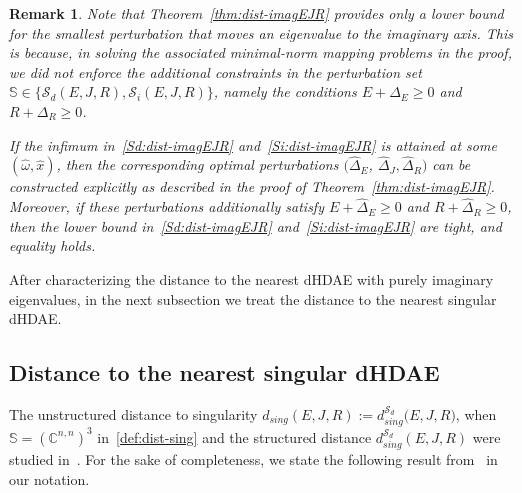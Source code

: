 \documentclass[11pt]{article}
\newtheorem{remark}[theorem]{Remark}
\newcommand{\C}{\mathbb C}
\begin{document}
\begin{remark}{\rm
    Note that Theorem~\ref{thm:dist-imagEJR} provides only a lower bound for the smallest perturbation that moves an eigenvalue to the imaginary axis. This is because, in solving the associated minimal-norm mapping problems in the proof, we did not enforce the additional constraints in the perturbation set $\mathbb S \in \{\mathcal S_d(E,J,R),\mathcal S_i(E,J,R)\}$, namely the conditions $E+\Delta_E \ge 0$ and $R+\Delta_R \ge 0$.

    If the infimum in~\eqref{Sd:dist-imagEJR} and~\eqref{Si:dist-imagEJR} is attained at some $(\hat \omega,\hat x)$, then the corresponding optimal perturbations $(\hat \Delta_E$, $\hat \Delta_J, \hat \Delta_R)$ can be constructed explicitly as described in the proof of Theorem~\ref{thm:dist-imagEJR}. Moreover, if these perturbations additionally satisfy $E+\hat \Delta_E \ge 0$ and $R+\hat \Delta_R \ge 0$, then the lower bound in~\eqref{Sd:dist-imagEJR} and~\eqref{Si:dist-imagEJR} are tight, and equality holds.
    }
\end{remark}
%
After characterizing the distance to the nearest dHDAE with purely imaginary eigenvalues, in the next subsection we treat the distance to the nearest singular dHDAE.
\subsection{Distance to the nearest singular dHDAE}\label{sec:distsing}

The unstructured distance to singularity $d_{sing}(E,J,R):=d_{sing}^{\mathcal S_d}{\mathbb(E,J,R)}$, when $\mathbb S={(\C^{n,n})}^3$ in~\eqref{def:dist-sing} and the structured distance $d_{sing}^{\mathcal S_d}(E,J,R)$ were studied in~\cite{PraS22}. For the sake of completeness, we state the following result from~\cite{PraS22} in our notation.
\end{document}
